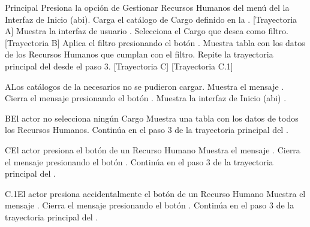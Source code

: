 \begin{UCtrayectoria}{Principal}
    \UCpaso[\UCactor] Presiona la opción de Gestionar Recursos Humanos del menú del la Interfaz de Inicio (abi).
    \UCpaso Carga el catálogo de Cargo definido en la . [Trayectoria A]
    \UCpaso Muestra la interfaz de usuario .
    \UCpaso[\UCactor] Selecciona el Cargo que desea como filtro. [Trayectoria B]
    \UCpaso[\UCactor] Aplica el filtro presionando el botón .
    \UCpaso Muestra tabla con los datos de los Recursos Humanos que cumplan con el filtro.
    \UCpaso Repite la trayectoria principal del  desde el paso 3. [Trayectoria C] [Trayectoria C.1]
\end{UCtrayectoria}
\begin{UCtrayectoriaA}{A}{Los catálogos de la  necesarios no se pudieron cargar.}
    \UCpaso Muestra el mensaje .
    \UCpaso[\UCactor] Cierra el mensaje presionando el botón .
    \UCpaso Muestra la interfaz de Inicio (abi) .
\end{UCtrayectoriaA}
\begin{UCtrayectoriaA}{B}{El actor no selecciona ningún Cargo}
    \UCpaso Muestra una tabla con los datos de todos los Recursos Humanos.
    \UCpaso Continúa en el paso 3 de la trayectoria principal del .
\end{UCtrayectoriaA}
\begin{UCtrayectoriaA}{C}{El actor presiona el botón  de un Recurso Humano}
    \UCpaso Muestra el mensaje .
    \UCpaso[\UCactor] Cierra el mensaje presionando el botón .
    \UCpaso Continúa en el paso 3 de la trayectoria principal del .
\end{UCtrayectoriaA}
\begin{UCtrayectoriaA}{C.1}{El actor presiona accidentalmente el botón  de un Recurso Humano}
    \UCpaso Muestra el mensaje .
    \UCpaso[\UCactor] Cierra el mensaje presionando el botón .
    \UCpaso Continúa en el paso 3 de la trayectoria principal del .
\end{UCtrayectoriaA}